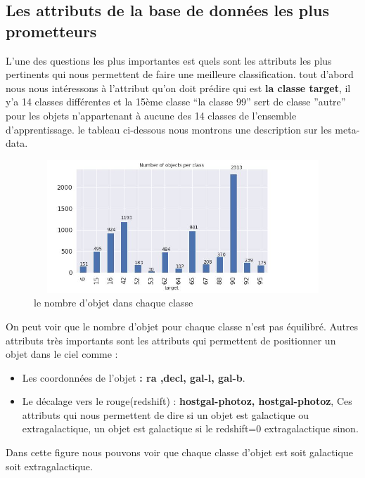 \newline
\subsection{Les attributs de la base de données les plus prometteurs}
L’une des questions les plus importantes est quels sont les attributs les plus pertinents qui nous permettent de faire une meilleure classification. tout d’abord nous nous intéressons à l’attribut qu’on doit prédire qui est \textbf{la classe target}, il y’a 14 classes différentes et la 15ème classe “la classe 99” sert de classe ”autre” pour les objets n’appartenant à aucune des 14 classes de l’ensemble d’apprentissage.
le tableau ci-dessous nous montrons une description sur les meta-data.
\begin{figure}[!h]
    \centering
    \includegraphics[width=15cm,height=5cm]{report/figures/objet-class.jpg}
    \caption{le nombre d'objet dans chaque classe}
    \label{fig:my_label}
\end{figure}
\newline
On peut voir que le nombre d'objet pour chaque classe n'est pas équilibré.
\newline
\newline
Autres attributs très importants sont les attributs qui permettent de positionner un objet dans le ciel comme :
\begin{itemize}
    \item Les coordonnées de l’objet \textbf{: ra ,decl, gal-l, gal-b}.
    \item Le décalage vers le rouge(redshift) :\textbf{ hostgal-photoz, hostgal-photoz}, Ces attributs qui nous permettent de dire si un objet est galactique ou extragalactique, un objet est galactique si le redshift=0 extragalactique sinon.
\end{itemize}
Dans cette figure nous pouvons voir que chaque classe d'objet est soit galactique soit extragalactique.
\newline

